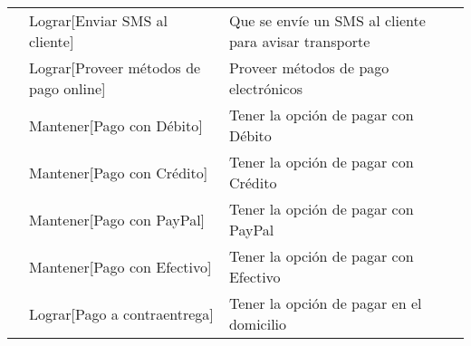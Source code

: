 \documentclass[a4paper]{article}
\begin{document}
\begin{table}[h]
\begin{tabular}{p{2cm} p{7cm} p{8cm}}
\rule{0pt}{1.2em} & Lograr[Enviar SMS al cliente] & Que se envíe un SMS al cliente para avisar transporte\\[0.2em]

\rule{0pt}{1.2em} & Lograr[Proveer métodos de pago online] & Proveer métodos de pago electrónicos\\[0.2em]

\rule{0pt}{1.2em} & Mantener[Pago con Débito] & Tener la opción de pagar con Débito\\[0.2em]

\rule{0pt}{1.2em} & Mantener[Pago con Crédito] & Tener la opción de pagar con Crédito\\[0.2em]

\rule{0pt}{1.2em} & Mantener[Pago con PayPal] & Tener la opción de pagar con PayPal\\[0.2em]

\rule{0pt}{1.2em} & Mantener[Pago con Efectivo] & Tener la opción de pagar con Efectivo\\[0.2em]

\rule{0pt}{1.2em} & Lograr[Pago a contraentrega] & Tener la opción de pagar en el domicilio\\[0.2em]

\end{tabular}
\end{table}

\clearpage
\end{document}
